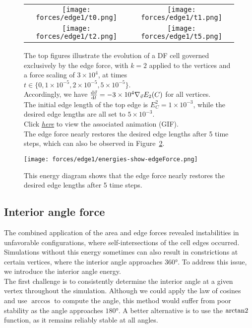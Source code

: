 \begin{figure}[h!]
    \centering
    \begin{tabular}{cc}
        \texttt{[image: forces/edge1/t0.png]} &
        \texttt{[image: forces/edge1/t1.png]} \\
        \texttt{[image: forces/edge1/t2.png]} &
        \texttt{[image: forces/edge1/t5.png]} \\
    \end{tabular}
    \caption{The top figures illustrate the evolution of a DF cell governed exclusively by the edge force, with $k=2$ applied to the vertices and a force scaling of $3\times 10^{4}$, at times $t \in \{0, 1\times 10^{-5}, 2\times 10^{-5}, 5\times 10^{-5}\}$.\\
		Accordingly, we have $\frac{\mathrm{d} \vec{v}}{\mathrm{d} t} = - 3\times 10^{4} \nabla_{\vec{v}} E_2(C)$ for all vertices.\\
		The initial edge length of the top edge is $E_C^2 = 1\times 10^{-3}$, while the desired edge lengths are all set to $5\times 10^{-3}$.\\
		Click \href{https://github.com/tivo476c/FlexibleCellModel/blob/master/figures/gifs/showForces/show-edgeForce.gif}{\textit{here}} to view the associated animation (GIF).\\
		The edge force nearly restores the desired edge lengths after 5 time steps, which can also be observed in Figure~\ref{fig:edgeEnergyDiagram}.
		}
		\label{fig:edgeForce}
\end{figure}
\begin{figure}[h!]
    \centering
        \texttt{[image: forces/edge1/energies-show-edgeForce.png]} 
    \caption{This energy diagram shows that the edge force nearly restores the desired edge lengths after 5 time steps.}
	\label{fig:edgeEnergyDiagram}    
\end{figure}

\subsection{Interior angle force}
The combined application of the area and edge forces revealed instabilities in unfavorable configurations, where self-intersections of the cell edges occurred. 
Simulations without this energy sometimes can also result in constrictions at certain vertices, where the interior angle approaches $360$°. 
To address this issue, we introduce the interior angle energy. \\
The first challenge is to consistently determine the interior angle at a given vertex throughout the simulation.
Although we could apply the law of cosines and use $\arccos$ to compute the angle, this method would suffer from poor stability as the angle approaches $180$°.
A better alternative is to use the $\operatorname{arctan2}$ function, as it remains reliably stable at all angles. \\

